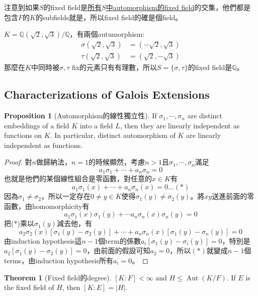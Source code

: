 \documentclass[12pt]{article}
\theoremstyle{definition}
\newtheorem{thm}{Theorem}
\newtheorem{prop}{Proposition}
\newcommand{\QQ}{\mathbb Q}
\DeclareMathOperator{\Aut}{Aut}
\begin{document}
注意到如果$S$的fixed field是\underline{所有$S$中automorphism的fixed field}的交集，他們都是包含$F$的$K$的subfields就是，所以fixed field的確是個field。

\begin{ex}
	$K=\QQ(\sqrt{2},\sqrt{3})/\QQ$，有兩個autumorphism:
	\begin{align*}
		\sigma(\sqrt2,\sqrt3) & =(-\sqrt2,\sqrt3) \\
		\tau(\sqrt2,\sqrt3)   & =(\sqrt2,-\sqrt3)
	\end{align*}
	那麼在$K$中同時被$\sigma, \tau$ fix的元素只有有理數，所以$S=\{\sigma,\tau\}$的fixed field是$\QQ$。
\end{ex}

\subsection{Characterizations of Galois Extensions}

\begin{prop}[Automorphism的線性獨立性]
	If $\sigma_1,\cdots,\sigma_n$ are distinct embeddings of a field $K$ into a field $L$, then they are linearly independent as functions on $K$. In particular, distinct automorphism of $K$ are linearly independent as functions.
\end{prop}

\begin{proof}
	對$n$做歸納法，$n=1$的時候顯然，考慮$n>1$且$\sigma_1,\cdots,\sigma_n$滿足
	\[a_1\sigma_1+\cdots+a_n\sigma_n=0\]
	也就是他們的某個線性組合是零函數，對任意的$x\in K$有
	\[a_1\sigma_1(x)+\cdots+a_n\sigma_n(x)=0...(*)\]
	因為$\sigma_1\neq\sigma_2$，所以一定存在$0\neq y\in K$使得$\sigma_1(y)\neq\sigma_2(y)$。將$xy$送進前面的零函數，由homomorphicity有
	\[a_1\sigma_1(x)\sigma_1(y)+\cdots a_n\sigma_n(x)\sigma_n(y)=0\]
	把(*)乘以$\sigma_1(y)$減去他，有
	\[a_2\sigma_2(x)[\sigma_1(y)-\sigma_2(y)]+\cdots+a_n\sigma_n(x)[\sigma_1(y)-\sigma_n(y)]=0\]
	由induction hypothesis這$n-1$個term的係數$a_i[\sigma_1(y)-\sigma_i(y)]=0$，特別是$a_2[\sigma_1(y)-\sigma_2(y)]=0$，由前面的假設可知$a_2=0$，所以$(*)$就變成$n-1$個terms，由induction hypothesis所有$a_i=0$。
\end{proof}

\begin{thm}[Fixed field的degree]\label{fixed_field_degree}
	$[K:F]<\infty$ and $H\le \Aut(K/F)$. If $E$ is the fixed field of $H$, then $[K:E]=|H|$.
\end{thm}
\end{document}
